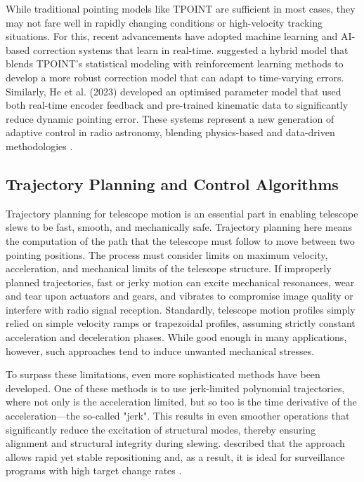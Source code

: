     While traditional pointing models like TPOINT are sufficient in most cases, they may not fare well in rapidly changing conditions or high-velocity tracking situations. For this, recent advancements have adopted machine learning and AI-based correction systems that learn in real-time. \cite{He2023, Waltenberger2024} suggested a hybrid model that blends TPOINT's statistical modeling with reinforcement learning methods to develop a more robust correction model that can adapt to time-varying errors. Similarly, He et al. (2023) developed an optimised parameter model that used both real-time encoder feedback and pre-trained kinematic data to significantly reduce dynamic pointing error. These systems represent a new generation of adaptive control in radio astronomy, blending physics-based and data-driven methodologies \cite{He2023, Waltenberger2024}.

    \subsection{Trajectory Planning and Control Algorithms}
    Trajectory planning for telescope motion is an essential part in enabling telescope slews to be fast, smooth, and mechanically safe. Trajectory planning here means the computation of the path that the telescope must follow to move between two pointing positions. The process must consider limits on maximum velocity, acceleration, and mechanical limits of the telescope structure. If improperly planned trajectories, fast or jerky motion can excite mechanical resonances, wear and tear upon actuators and gears, and vibrates to compromise image quality or interfere with radio signal reception. Standardly, telescope motion profiles simply relied on simple velocity ramps or trapezoidal profiles, assuming strictly constant acceleration and deceleration phases. While good enough in many applications, however, such approaches tend to induce unwanted mechanical stresses.

    To surpass these limitations, even more sophisticated methods have been developed. One of these methods is to use jerk-limited polynomial trajectories, where not only is the acceleration limited, but so too is the time derivative of the acceleration—the so-called "jerk". This results in even smoother operations that significantly reduce the excitation of structural modes, thereby ensuring alignment and structural integrity during slewing. \cite{Savarese2020} described that the approach allows rapid yet stable repositioning and, as a result, it is ideal for surveillance programs with high target change rates \cite{Savarese2020}.

